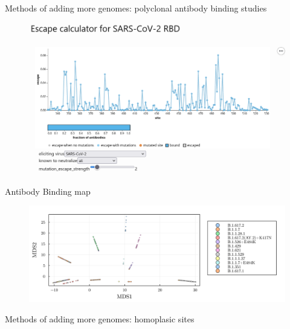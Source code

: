 \documentclass{beamer}
\begin{document}
\begin{frame}{Methods of adding more genomes: polyclonal antibody binding studies}
    \begin{figure}
        \includegraphics[width=\textwidth]{standalone/2022-07-06-13-06-32.png}
    \end{figure}
    \centering
\vfill
\tiny{\cite{greaney2022antibody}}
\end{frame}


\begin{frame}{Antibody Binding map}
    \begin{figure}
        \includegraphics[width=\textwidth]{my_figs/binding_usa_multidimensional_scaling.png}
    \end{figure}
\end{frame}

\begin{frame}{Methods of adding more genomes: homoplasic sites}
    \begin{figure}
        \centering
        \scalebox{1.1}{
        
        }
    \end{figure}
    \centering
    \vfill
    \tiny{\cite{page2009molecular}}
\end{frame}
\end{document}
